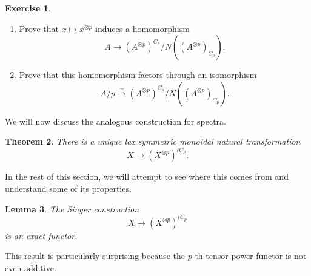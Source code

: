 \documentclass[10pt, oneside]{memoir}
\newtheorem{thm}{Theorem}[subsection]
\newtheorem{lem}[thm]{Lemma}
\theoremstyle{definition}
\newtheorem{exer}[thm]{Exercise}
\theoremstyle{remark}
\theoremstyle{plain}
\theoremstyle{definition}
\theoremstyle{remark}
\newcommand{\1}{\mathbf{1}}
\newcommand{\2}{\mathbf{2}}
\newcommand{\3}{\mathbf{3}}
\begin{document}
\begin{exer}\leavevmode
    \begin{enumerate}
        \item Prove that $x \mapsto x^{\otimes p}$ induces a homomorphism
        \[ A \to (A^{\otimes p})^{C_p}/N((A^{\otimes p})_{C_p}). \]
        \item Prove that this homomorphism factors through an isomorphism
        \[ A/p \xrightarrow{\sim} (A^{\otimes p})^{C_p}/N((A^{\otimes p})_{C_p}). \]
    \end{enumerate}
\end{exer}

We will now discuss the analogous construction for spectra.
\begin{thm}
    There is a unique lax symmetric monoidal natural transformation
    \[ X \to (X^{\otimes p})^{t C_p}. \]
\end{thm}

In the rest of this section, we will attempt to see where this comes from and understand some of its properties.

\begin{lem}
    The Singer construction
    \[ X \mapsto (X^{\otimes p})^{t C_p} \]
    is an exact functor.
\end{lem}
This result is particularly surprising because the $p$-th tensor power functor is not even additive.
\end{document}
